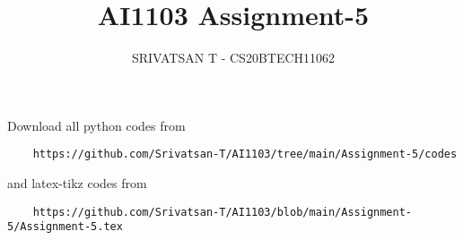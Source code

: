 \documentclass[journal,12pt,twocolumn]{IEEEtran}
\DeclareMathOperator*{\Res}{Res}
\begin{document}
\newcommand{\BEQA}{\begin{eqnarray}}
        \newcommand{\EEQA}{\end{eqnarray}}
\newcommand{\define}{\stackrel{\triangle}{=}}

\raggedbottom
\setlength{\parindent}{0pt}
\providecommand{\mbf}{\mathbf}
\providecommand{\pr}[1]{\ensuremath{\Pr\left(#1\right)}}
\providecommand{\qfunc}[1]{\ensuremath{Q\left(#1\right)}}
\providecommand{\sbrak}[1]{\ensuremath{{}\left[#1\right]}}
\providecommand{\lsbrak}[1]{\ensuremath{{}\left[#1\right.}}
\providecommand{\rsbrak}[1]{\ensuremath{{}\left.#1\right]}}
\providecommand{\brak}[1]{\ensuremath{\left(#1\right)}}
\providecommand{\lbrak}[1]{\ensuremath{\left(#1\right.}}
\providecommand{\rbrak}[1]{\ensuremath{\left.#1\right)}}
\providecommand{\cbrak}[1]{\ensuremath{\left\{#1\right\}}}
\providecommand{\lcbrak}[1]{\ensuremath{\left\{#1\right.}}
\providecommand{\rcbrak}[1]{\ensuremath{\left.#1\right\}}}
\theoremstyle{remark}
\newtheorem{rem}{Remark}
\newcommand{\sgn}{\mathop{\mathrm{sgn}}}
\providecommand{\abs}[1]{\vert#1\vert}
\providecommand{\res}[1]{\Res\displaylimits_{#1}}
\providecommand{\norm}[1]{\lVert#1\rVert}
\providecommand{\mtx}[1]{\mathbf{#1}}
\providecommand{\mean}[1]{E[#1]}
\providecommand{\fourier}{\overset{\mathcal{F}}{ \rightleftharpoons}}
\providecommand{\system}{\overset{\mathcal{H}}{ \longleftrightarrow}}
\newcommand{\solution}{\noindent \textbf{Solution: }}
\newcommand{\cosec}{\,\text{cosec}\,}
\newcommand{\comb}[2]{{}^{#1}\mathrm{C}_{#2}}
\providecommand{\dec}[2]{\ensuremath{\overset{#1}{\underset{#2}{\gtrless}}}}
\newcommand{\myvec}[1]{\ensuremath{\begin{pmatrix}#1\end{pmatrix}}}
\newcommand{\mydet}[1]{\ensuremath{\begin{vmatrix}#1\end{vmatrix}}}
\makeatletter
{}
\makeatother
\let\StandardTheFigure\thefigure
\let\vec\mathbf
\renewcommand{\thefigure}{\theproblem}
\def\putbox#1#2#3{\makebox[0in][l]{\makebox[#1][l]{}\raisebox{\baselineskip}[0in][0in]{\raisebox{#2}[0in][0in]{#3}}}}
\def\rightbox#1{\makebox[0in][r]{#1}}
\def\centbox#1{\makebox[0in]{#1}}
\def\topbox#1{\raisebox{-\baselineskip}[0in][0in]{#1}}
\def\midbox#1{\raisebox{-0.5\baselineskip}[0in][0in]{#1}}
\vspace{3cm}
\title{AI1103 Assignment-5}
\author{SRIVATSAN T - CS20BTECH11062}
\maketitle
\newpage
\bigskip
\renewcommand{\thefigure}{\theenumi}
\renewcommand{\thetable}{\theenumi}
Download all python codes from
\begin{lstlisting}
    https://github.com/Srivatsan-T/AI1103/tree/main/Assignment-5/codes
\end{lstlisting}
%
and latex-tikz codes from
%
\begin{lstlisting}
    https://github.com/Srivatsan-T/AI1103/blob/main/Assignment-5/Assignment-5.tex
\end{lstlisting}
\end{document}

